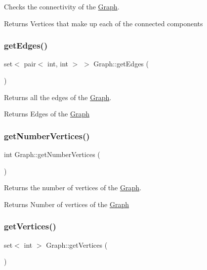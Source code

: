 Checks the connectivity of the \hyperlink{classGraph}{Graph}. 

\begin{DoxyReturn}{Returns}
Vertices that make up each of the connected components 
\end{DoxyReturn}
\mbox{\label{classGraph_a2e4fed16e6046a6274cf317c794cc0c3}} 
\subsubsection{\texorpdfstring{get\+Edges()}{getEdges()}}
{\footnotesize\ttfamily set$<$ pair$<$ int, int $>$ $>$ Graph\+::get\+Edges (\begin{DoxyParamCaption}{ }\end{DoxyParamCaption})}



Returns all the edges of the \hyperlink{classGraph}{Graph}. 

\begin{DoxyReturn}{Returns}
Edges of the \hyperlink{classGraph}{Graph} 
\end{DoxyReturn}
\mbox{\label{classGraph_a37480eba273bdc76a05ee24633830000}} 
\subsubsection{\texorpdfstring{get\+Number\+Vertices()}{getNumberVertices()}}
{\footnotesize\ttfamily int Graph\+::get\+Number\+Vertices (\begin{DoxyParamCaption}{ }\end{DoxyParamCaption})}



Returns the number of vertices of the \hyperlink{classGraph}{Graph}. 

\begin{DoxyReturn}{Returns}
Number of vertices of the \hyperlink{classGraph}{Graph} 
\end{DoxyReturn}
\mbox{\label{classGraph_a4acd450439bb4209953c10ac45ad47b2}} 
\subsubsection{\texorpdfstring{get\+Vertices()}{getVertices()}}
{\footnotesize\ttfamily set$<$ int $>$ Graph\+::get\+Vertices (\begin{DoxyParamCaption}{ }\end{DoxyParamCaption})}



